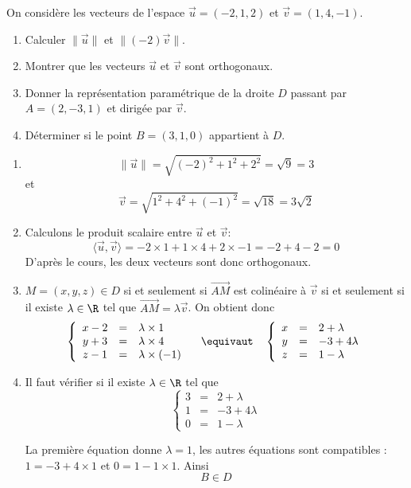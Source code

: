 




\begin{exercice}
On considère les vecteurs de l'espace $\vec{u} =(-2,1,2)$ et $\vec{v} =(1,4,-1)$.
\begin{enumerate}
\item Calculer $\|\vec{u} \|$ et $\| (-2) \vec{v}\|$.
\item Montrer que les vecteurs $\vec{u}$ et $\vec{v}$ sont orthogonaux. 
\item Donner la représentation paramétrique de la droite $D$ passant par $A= (2,-3,1)$ et dirigée par $\vec{v}$. 
\item Déterminer si le point $B=(3,1,0)$ appartient à $D$.  
\end{enumerate} 
\end{exercice}

\begin{correction}
\begin{enumerate}
\item $$\|\vec{u} \| = \sqrt{ (-2)^2+1^2 +2^2 }= \sqrt{ 9}=3$$
et 
$$ \vec{v}= \sqrt{ 1^2+4^2 +(-1)^2 }= \sqrt{ 18}=3\sqrt{2}$$
\item Calculons le produit scalaire entre $\vec{u}$ et $\vec{v}$:  $$\langle \vec{u}, \vec{v}\rangle = -2 \times 1 + 1 \times 4 +2\times -1  = -2+4-2=0$$
D'après le cours, les deux vecteurs sont donc orthogonaux. 
\item $M=(x,y,z)\in D$ si et seulement si $\vec{AM}$ est colinéaire à $\vec{v}$ si et seulement si il existe $\lambda \in \R $ tel que $\vec{AM} = \lambda \vec{v}$. On obtient donc 
$$\left\{ \begin{array}{ccl}
x-2&=&\lambda \times 1\\
y+3&=&\lambda \times 4\\
z-1&=&\lambda \times (-1)
\end{array}\right.  \quad \equivaut \quad \left\{ \begin{array}{ccl}
x&=&2+\lambda \\
y&=&-3+4\lambda \\
z&=&1-\lambda 
\end{array}\right.  $$

\item Il faut vérifier si il existe $\lambda \in \R$ tel que 
$$\left\{ \begin{array}{ccl}
3&=&2+\lambda \\
1&=&-3+4\lambda \\
0&=&1-\lambda 
\end{array}\right.  $$

La première équation donne $\lambda=1$, les autres équations sont compatibles : $1 = -3+4\times 1 $ et $ 0 = 1- 1\times 1$.  Ainsi $$B\in D$$
\end{enumerate} 
\end{correction}